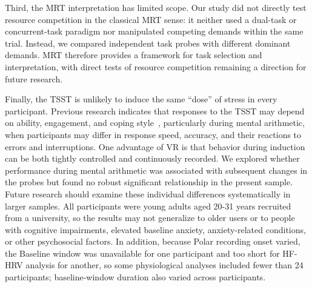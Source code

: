 Third, the MRT interpretation has limited scope. Our study did not directly test resource competition in the classical MRT sense: it neither used a dual-task or concurrent-task paradigm nor manipulated competing demands within the same trial. Instead, we compared independent task probes with different dominant demands. MRT therefore provides a framework for task selection and interpretation, with direct tests of resource competition remaining a direction for future research.

Finally, the TSST is unlikely to induce the same ``dose'' of stress in every participant. Previous research indicates that responses to the TSST may depend on ability, engagement, and coping style~\citep{kudielka2007ten}, particularly during mental arithmetic, when participants may differ in response speed, accuracy, and their reactions to errors and interruptions. One advantage of VR is that behavior during induction can be both tightly controlled and continuously recorded. We explored whether performance during mental arithmetic was associated with subsequent changes in the probes but found no robust significant relationship in the present sample. Future research should examine these individual differences systematically in larger samples. All participants were young adults aged 20-31 years recruited from a university, so the results may not generalize to older users or to people with cognitive impairments, elevated baseline anxiety, anxiety-related conditions, or other psychosocial factors. In addition, because Polar recording onset varied, the Baseline window was unavailable for one participant and too short for HF-HRV analysis for another, so some physiological analyses included fewer than 24 participants; baseline-window duration also varied across participants.





